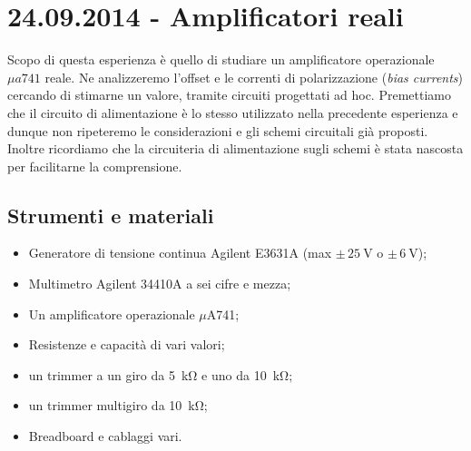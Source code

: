 \section{24.09.2014 - Amplificatori reali}

Scopo di questa esperienza è quello di studiare un amplificatore operazionale $\mu a 741$ reale.
Ne analizzeremo l'offset e le correnti di polarizzazione (\textit{bias currents}) cercando di stimarne un valore, tramite circuiti progettati ad hoc.
Premettiamo che il circuito di alimentazione è lo stesso utilizzato nella precedente esperienza e dunque non ripeteremo le considerazioni e gli schemi circuitali già proposti.
Inoltre ricordiamo che la circuiteria di alimentazione sugli schemi è stata nascosta per facilitarne la comprensione.

\subsection{Strumenti e materiali}

\begin{itemize} [noitemsep]
\item Generatore di tensione continua Agilent E3631A (max $\pm \, \SI{25}{\volt}$ o $\pm \, \SI{6}{\volt}$);
\item Multimetro Agilent 34410A a sei cifre e mezza;
\item Un amplificatore operazionale $\mu$A741;
\item Resistenze e capacità di vari valori;
\item un trimmer a un giro da \SI{5}{\kilo\ohm} e uno da \SI{10}{\kilo\ohm};
\item un trimmer multigiro da \SI{10}{\kilo\ohm};
\item Breadboard e cablaggi vari.
\end{itemize}
